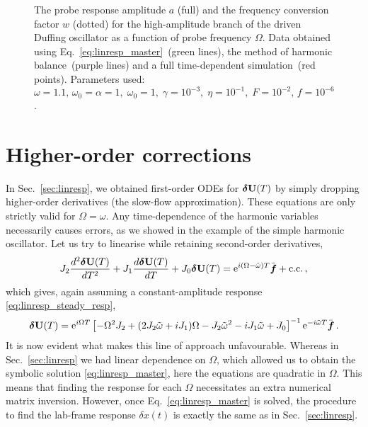 \begin{figure} [h!]
	\centering
	
	\vspace*{-3mm}
	\caption{The probe response amplitude $a$ (full) and the frequency conversion factor $w$ (dotted) for the high-amplitude branch of the driven Duffing oscillator as a function of probe frequency $\Omega$. Data obtained using Eq.~\eqref{eq:linresp_master}~(green lines), the method of harmonic balance~(purple lines) and a full time-dependent simulation~(red points). Parameters used: $\omega=1.1,\,\omega_0 = \alpha = 1, \; \omega_0 = 1, \; \gamma = 10^{-3} , \; \eta = 10^{-1},\; F = 10^{-2},\,f = 10^{-6}$.}
	
	\label{fig:linresp_Duffing_bench} 
\end{figure}

\section{Higher-order corrections} \label{sec:noisecorr}

In Sec.~\ref{sec:linresp}, we obtained first-order ODEs for $\boldsymbol{\delta} \vb{U}(T)$ by simply dropping higher-order derivatives (the slow-flow approximation). These equations are only strictly valid for $\Omega=\omega$. Any time-dependence of the harmonic variables necessarily causes errors, as we showed in the example of the simple harmonic oscillator. Let us try to linearise while retaining second-order derivatives,
\begin{equation}
J_2 \frac{d^2 \boldsymbol{\delta} \vb{U}(T)}{dT^2} + J_1 \frac{d \boldsymbol{\delta} \vb{U}(T)}{d T} + J_0 \boldsymbol{\delta} \vb{U}(T) = {\rm e}^{i (\Omega - \tilde{\omega}) T} \bar{\boldsymbol{f}} + \text{c.c.}\,,
\end{equation}
which gives, again assuming a constant-amplitude response \eqref{eq:linresp_steady_resp},
\begin{equation} \label{eq:respcorr_master}
\boldsymbol{\delta} \vb{U}(T) = {\rm e}^{i \Omega T} \left[ -\Omega^2 J_2 + (2 J_2 \tilde{\omega} + i J_1) \Omega - J_2 \tilde{\omega}^2 - i J_1 \tilde{\omega} + J_0 \right]^{-1} {\rm e}^{-i \tilde{\omega} T } \bar{\boldsymbol{f}} \,.
\end{equation}
It is now evident what makes this line of approach unfavourable. Whereas in Sec.~\ref{sec:linresp} we had linear dependence on $\Omega$, which allowed us to obtain the symbolic solution \eqref{eq:linresp_master}, here the equations are quadratic in $\Omega$. This means that finding the response for each $\Omega$ necessitates an extra numerical matrix inversion. However, once Eq.~\eqref{eq:linresp_master} is solved, the procedure to find the lab-frame response $\delta x(t)$ is exactly the same as in Sec.~\ref{sec:linresp}. %

